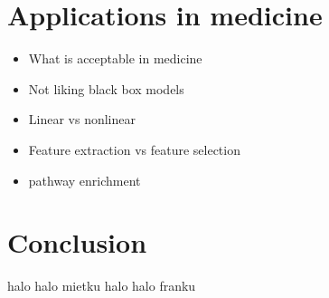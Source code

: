\documentclass[12pt, wide]{mwart}
\begin{document}
\section{Applications in medicine}

\begin{itemize}
    \item What is acceptable in medicine
    \item Not liking black box models
    \item Linear vs nonlinear
    \item Feature extraction vs feature selection
    \item pathway enrichment
\end{itemize}

\section{Conclusion}
halo halo mietku halo halo franku



\end{document}

